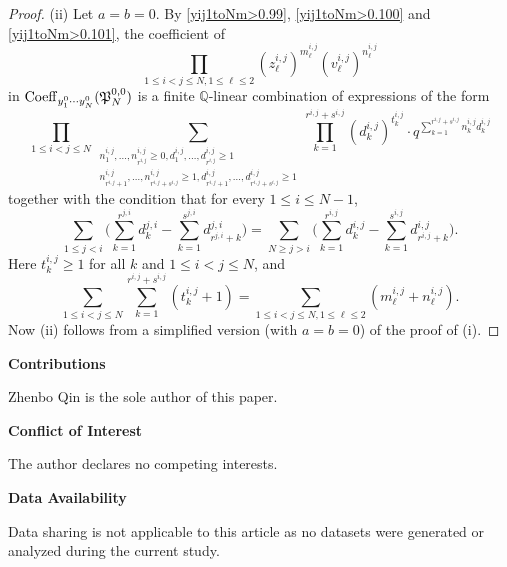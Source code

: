 \documentclass[12pt, reqno]{amsart}
\theoremstyle{definition}
\theoremstyle{remark}
\numberwithin{equation}{section}
\newcommand{\Coe}{ {\rm Coeff} }
\newcommand{\Q}{ \mathbb Q }
\numberwithin{equation}{section}
\begin{document}
\begin{proof}
(ii) Let $a=b=0$. By \eqref{yij1toNm>0.99}, \eqref{yij1toNm>0.100} and 
\eqref{yij1toNm>0.101}, the coefficient of 
$$
\prod_{1 \le i < j \le N, 1 \le \ell \le 2} (z_\ell^{i,j})^{m_\ell^{i,j}}
(v_\ell^{i,j})^{n_\ell^{i,j}}
$$ 
in 
$
\Coe_{y_1^0 \cdots y_N^0}(\mathfrak P_{N}^{0,0})
$ 
is a finite $\Q$-linear combination of expressions of the form
$$ 
\prod_{1 \le i < j \le N}
\sum_{\substack{n_1^{i,j}, \ldots, n_{r^{i,j}}^{i,j} \ge 0, 
    d_1^{i,j}, \ldots, d_{r^{i,j}}^{i,j} \ge 1\\
    n_{r^{i,j}+1}^{i,j}, \ldots, n_{r^{i,j}+s^{i,j}}^{i,j} \ge 1, 
    d_{r^{i,j}+1}^{i,j}, \ldots, d_{r^{i,j}+s^{i,j}}^{i,j} \ge 1}}
  \prod_{k=1}^{r^{i,j}+s^{i,j}} (d_k^{i,j})^{t_k^{i,j}} 
\cdot q^{\sum_{k=1}^{r^{i,j}+s^{i,j}} n_k^{i,j} d_k^{i,j}}
$$
together with the condition that for every $1 \le i \le N-1$,
$$
\sum_{1 \le j < i} \bigg (\sum_{k=1}^{r^{j,i}} d_k^{j,i} 
    - \sum_{k=1}^{s^{j,i}} d_{r^{j,i}+k}^{j,i} \bigg )
= \sum_{N \ge j > i} \bigg (\sum_{k=1}^{r^{i,j}} d_k^{i,j} 
    - \sum_{k=1}^{s^{i,j}} d_{r^{i,j}+k}^{i,j} \bigg ).
$$
Here $t_k^{i,j} \ge 1$ for all $k$ and $1 \le i < j \le N$, and 
$$
  \sum_{1 \le i < j \le N} \sum_{k=1}^{r^{i,j}+s^{i,j}} (t_k^{i,j} +1)
= \sum_{1 \le i < j \le N, 1 \le \ell \le 2} 
   (m_\ell^{i,j} + n_\ell^{i,j}).
$$
Now (ii) follows from a simplified version (with $a=b=0$) of 
the proof of (i).
\end{proof}

\bigskip\noindent
{\bf Contributions}

Zhenbo Qin is the sole author of this paper.

\bigskip\noindent
{\bf Conflict of Interest}

The author declares no competing interests.

\bigskip\noindent
{\bf Data Availability}

Data sharing is not applicable to this article as no datasets were generated or 
analyzed during the current study.
\end{document}
